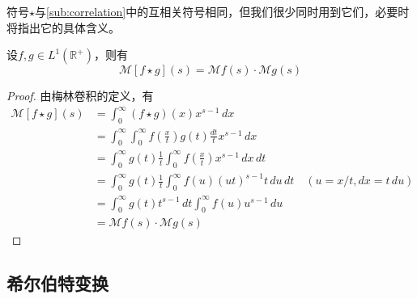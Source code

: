 符号$\star$与\ref{sub:correlation}中的互相关符号相同，但我们很少同时用到它们，必要时将指出它的具体含义。


\begin{proposition}[梅林卷积的变换性质]
    设$f,g\in L^1(\mathbb{R}^+)$，则有
    \[\mathcal{M} [f\star g](s)=\mathcal{M} f(s)\cdot \mathcal{M} g(s)\]
\end{proposition}
\begin{proof}
    由梅林卷积的定义，有
    \begin{align*}
        \mathcal{M} [f\star g](s)&=\int_0^{\infty}(f\star g)(x)x^{s-1}\,dx\\
        &=\int_0^{\infty}\int_0^{\infty}f\left(\frac{x}{t}\right)g(t)\frac{dt}{t}x^{s-1}\,dx\\
        &=\int_0^{\infty}g(t)\frac{1}{t}\int_0^{\infty}f\left(\frac{x}{t}\right)x^{s-1}\,dx\,dt\\
        &=\int_0^{\infty}g(t)\frac{1}{t}\int_0^{\infty}f(u)(ut)^{s-1}t\,du\,dt\quad (u=x/t,dx=t\,du)\\
        &=\int_0^{\infty}g(t)t^{s-1}\,dt\int_0^{\infty}f(u)u^{s-1}\,du\\
        &=\mathcal{M} f(s)\cdot \mathcal{M} g(s)
    \end{align*}
\end{proof}

\subsection{希尔伯特变换}\label{sub:hilbert}

